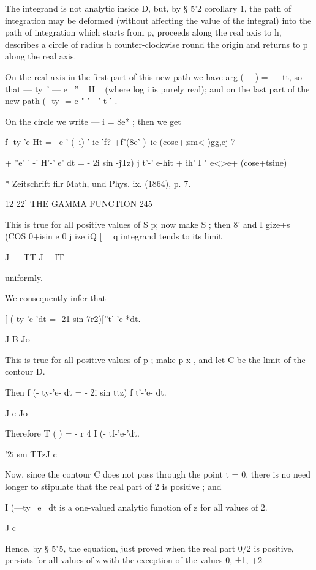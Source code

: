 The integrand is not analytic inside D, but, by § 5'2 corollary 1, the path 
of integration may be deformed (without affecting the value of the integral) 
into the path of integration which starts from p, proceeds along the real axis 
to h, describes a circle of radius h counter-clockwise round the origin and 
returns to p along the real axis. 

On the real axis in the first part of this new path we have arg (—  ) = — tt, 
so that  — ty~'  — e~ ''  ~ H ~  (where log i is purely real); and on the last 
part of the new path (- ty-  = e " ' - ' t ' . 

On the circle we write — i = 8e* ; then we get 

f  -ty-'e-Ht-= \ e-'-(--i) '-ie-'f? +f"(8e' )--ie (cose+;sm< )gg,ej 7  

+  ''e' ' -' H'-' e' dt 
= - 2i sin  -jTz) j t'-' e-hit + ih' I " e<>e+ (cose+tsine) \  

* Zeitschrift filr Math, und Phys. ix. (1864), p. 7. 



12 22] THE GAMMA FUNCTION 245 

This is true for all positive values of S   p; now make S   ; then 8'   
and I gize+s (COS 0+isin e  0   j  ize iQ  [   \ \  q integrand tends to its limit 

J — TT J —IT 

uniformly. 

We consequently infer that 

[ (-ty-'e-'dt = -21 sin  7r2)[''t'-'e-*dt. 

J B Jo 

This is true for all positive values of p ; make p  x , and let C be the 
limit of the contour D. 




Then f (- ty-'e- dt = - 2i sin  ttz) f t'-'e- dt. 

J c Jo 

Therefore T ( ) = - r 4 I (- tf-'e-'dt. 

'2i sm TTzJ c 

Now, since the contour C does not pass through the point t = 0, there 
is no need longer to stipulate that the real part of 2 is positive ; and 

I (—ty~ e~ dt is a one-valued analytic function of z for all values of 2. 

J c 

Hence, by § 5"5, the equation, just proved when the real part 0/2 is positive, 
persists for all values of z with the exception of the values 0, ±1, +2 

